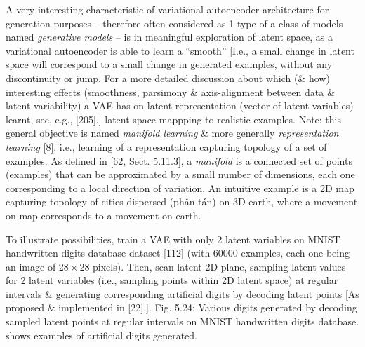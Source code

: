 \documentclass{article}
\begin{document}
\begin{itemize}
\begin{itemize}
\begin{itemize}
			A very interesting characteristic of variational autoencoder architecture for generation purposes -- therefore often considered as 1 type of a class of models named {\it generative models} -- is in meaningful exploration of latent space, as a variational autoencoder is able to learn a ``smooth'' [I.e., a small change in latent space will correspond to a small change in generated examples, without any discontinuity or jump. For a more detailed discussion about which (\& how) interesting effects (smoothness, parsimony \& axis-alignment between data \& latent variability) a VAE has on latent representation (vector of latent variables) learnt, see, e.g., [205].] latent space mappping to realistic examples. Note: this general objective is named {\it manifold learning} \& more generally {\it representation learning} [8], i.e., learning of a representation capturing topology of a set of examples. As defined in [62, Sect. 5.11.3], a {\it manifold} is a connected set of points (examples) that can be approximated by a small number of dimensions, each one corresponding to a local direction of variation. An intuitive example is a 2D map capturing topology of cities dispersed (phân tán) on 3D earth, where a movement on map corresponds to a movement on earth.

			To illustrate possibilities, train a VAE with only 2 latent variables on MNIST handwritten digits database dataset [112] (with 60000 examples, each one being an image of $28\times28$ pixels). Then, scan latent 2D plane, sampling latent values for 2 latent variables (i.e., sampling points within 2D latent space) at regular intervals \& generating corresponding artificial digits by decoding latent points [As proposed \& implemented in [22].]. {\sf Fig. 5.24: Various digits generated by decoding sampled latent points at regular intervals on MNIST handwritten digits database.} shows examples of artificial digits generated.


\end{itemize}
\end{itemize}
\end{itemize}
\end{document}
